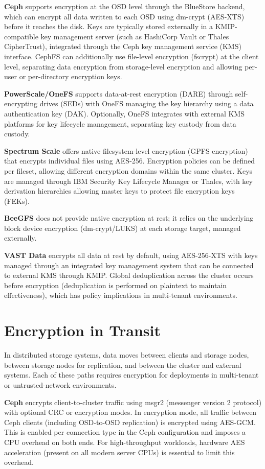 \textbf{Ceph} supports encryption at the OSD level through the BlueStore backend, which can encrypt all data written to each OSD using dm-crypt (AES-XTS) before it reaches the disk. Keys are typically stored externally in a KMIP-compatible key management server (such as HashiCorp Vault or Thales CipherTrust), integrated through the Ceph key management service (KMS) interface. CephFS can additionally use file-level encryption (fscrypt) at the client level, separating data encryption from storage-level encryption and allowing per-user or per-directory encryption keys.

\textbf{PowerScale/OneFS} supports data-at-rest encryption (DARE) through self-encrypting drives (SEDs) with OneFS managing the key hierarchy using a data authentication key (DAK). Optionally, OneFS integrates with external KMS platforms for key lifecycle management, separating key custody from data custody.

\textbf{Spectrum Scale} offers native filesystem-level encryption (GPFS encryption) that encrypts individual files using AES-256. Encryption policies can be defined per fileset, allowing different encryption domains within the same cluster. Keys are managed through IBM Security Key Lifecycle Manager or Thales, with key derivation hierarchies allowing master keys to protect file encryption keys (FEKs).

\textbf{BeeGFS} does not provide native encryption at rest; it relies on the underlying block device encryption (dm-crypt/LUKS) at each storage target, managed externally.

\textbf{VAST Data} encrypts all data at rest by default, using AES-256-XTS with keys managed through an integrated key management system that can be connected to external KMS through KMIP. Global deduplication across the cluster occurs before encryption (deduplication is performed on plaintext to maintain effectiveness), which has policy implications in multi-tenant environments.

\section{Encryption in Transit}
In distributed storage systems, data moves between clients and storage nodes, between storage nodes for replication, and between the cluster and external systems. Each of these paths requires encryption for deployments in multi-tenant or untrusted-network environments.

\textbf{Ceph} encrypts client-to-cluster traffic using msgr2 (messenger version 2 protocol) with optional CRC or encryption modes. In encryption mode, all traffic between Ceph clients (including OSD-to-OSD replication) is encrypted using AES-GCM. This is enabled per connection type in the Ceph configuration and imposes a CPU overhead on both ends. For high-throughput workloads, hardware AES acceleration (present on all modern server CPUs) is essential to limit this overhead.


